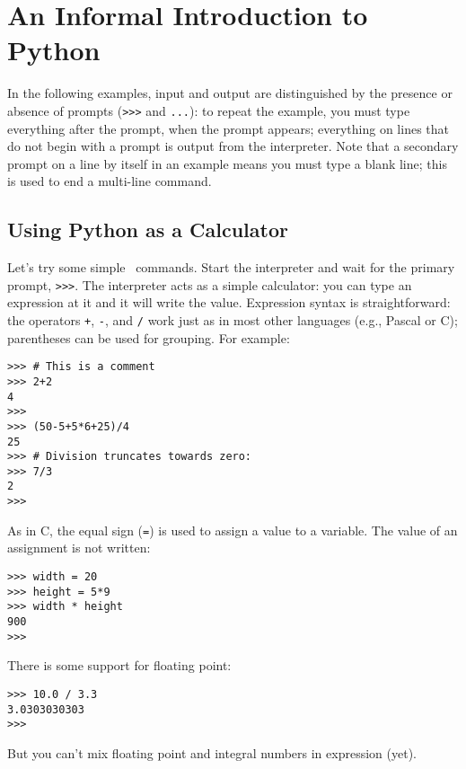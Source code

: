 \section{An Informal Introduction to Python}

In the following examples, input and output are distinguished by the
presence or absence of prompts ({\tt >>>} and {\tt ...}): to repeat the
example, you must type everything after the prompt, when the prompt
appears; everything on lines that do not begin with a prompt is output
from the interpreter.
Note that a secondary prompt on a line by itself in an example means you
must type a blank line; this is used to end a multi-line command.

\subsection{Using Python as a Calculator}

Let's try some simple \Python\ commands.
Start the interpreter and wait for the primary prompt,
{\tt >>>}.
The interpreter acts as a simple calculator: you can type an expression
at it and it will write the value.
Expression syntax is straightforward: the operators
{\tt +},
{\tt -},
{\tt *}
and
{\tt /}
work just as in most other languages (e.g., Pascal or C); parentheses
can be used for grouping.
For example:
\begin{code}\begin{verbatim}
>>> # This is a comment
>>> 2+2
4
>>> 
>>> (50-5+5*6+25)/4
25
>>> # Division truncates towards zero:
>>> 7/3
2
>>> 
\end{verbatim}\end{code}
As in C, the equal sign ({\tt =}) is used to assign a value to a variable.
The value of an assignment is not written:
\begin{code}\begin{verbatim}
>>> width = 20
>>> height = 5*9
>>> width * height
900
>>> 
\end{verbatim}\end{code}
There is some support for floating point:
\begin{code}\begin{verbatim}
>>> 10.0 / 3.3
3.0303030303
>>> 
\end{verbatim}\end{code}
But you can't mix floating point and integral numbers in expression (yet).

